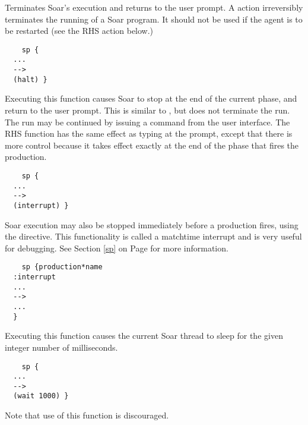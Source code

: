 \begin{description}

\item [\soarb{halt} ---]
	Terminates Soar's execution and returns to the user prompt.  A  action irreversibly terminates the running of a Soar program. It should not be used if the agent is to be restarted (see the  RHS action below.)

	\begin{verbatim}
	sp {
  ...
  -->
  (halt) }
	\end{verbatim}

\item [\soarb{interrupt} --- ]
	Executing this function causes Soar to stop at the end of the current phase, and return to the user prompt. This is similar to , but does not terminate the run. The run may be continued by issuing a  command from the user interface.  The  RHS function has the same effect as typing  at the prompt, except that there is more control because it takes effect exactly at the end of the phase that fires the production.

	\begin{verbatim}
	sp {
  ...
  -->
  (interrupt) }
	\end{verbatim}

	Soar execution may also be stopped immediately before a production fires, using the  directive. This functionality is called a matchtime interrupt and is very useful for debugging. See Section	\ref{sp} on Page \pageref{sp} for more information.

	\begin{verbatim}
	sp {production*name
  :interrupt
  ...
  -->
  ...
  }
	\end{verbatim}

\item [\soarb{wait} --- ]
	Executing this function causes the current Soar thread to sleep for the given integer number of milliseconds.

	\begin{verbatim}
	sp {
  ...
  -->
  (wait 1000) }
	\end{verbatim}

	Note that use of this function is discouraged.

\end{description}

